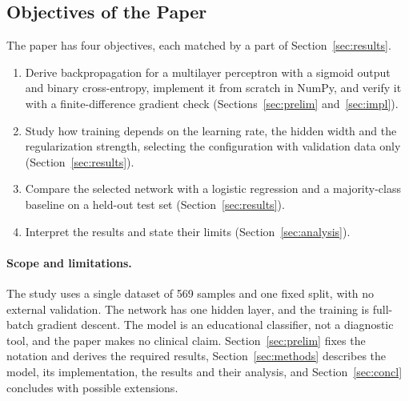 \subsection{Objectives of the Paper}
\label{sec:objectives}

The paper has four objectives, each matched by a part of Section~\ref{sec:results}.
\begin{enumerate}[label=\textbf{O\arabic*.}, leftmargin=*]
  \item Derive backpropagation for a multilayer perceptron with a sigmoid output and binary cross-entropy, implement it from scratch in NumPy, and verify it with a finite-difference gradient check (Sections~\ref{sec:prelim} and~\ref{sec:impl}).
  \item Study how training depends on the learning rate, the hidden width and the regularization strength, selecting the configuration with validation data only (Section~\ref{sec:results}).
  \item Compare the selected network with a logistic regression and a majority-class baseline on a held-out test set (Section~\ref{sec:results}).
  \item Interpret the results and state their limits (Section~\ref{sec:analysis}).
\end{enumerate}

\paragraph{Scope and limitations.}
The study uses a single dataset of 569 samples and one fixed split, with no external validation. The network has one hidden layer, and the training is full-batch gradient descent. The model is an educational classifier, not a diagnostic tool, and the paper makes no clinical claim. Section~\ref{sec:prelim} fixes the notation and derives the required results, Section~\ref{sec:methods} describes the model, its implementation, the results and their analysis, and Section~\ref{sec:concl} concludes with possible extensions.
